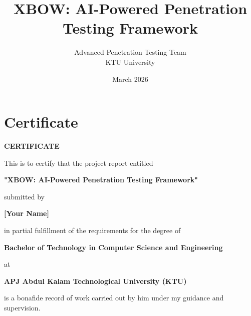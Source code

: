 \documentclass[12pt,a4paper]{report}
\title{XBOW: AI-Powered Penetration Testing Framework}
\author{Advanced Penetration Testing Team \\ KTU University}
\date{March 2026}
\begin{document}
\maketitle
\thispagestyle{empty}
\newpage

\chapter*{Certificate}
\thispagestyle{empty}

\begin{center}
    \vspace{2cm}
    
    \textbf{CERTIFICATE}
    
    \vspace{1cm}
    
    This is to certify that the project report entitled
    
    \vspace{0.5cm}
    
    \textbf{"XBOW: AI-Powered Penetration Testing Framework"}
    
    \vspace{0.5cm}
    
    submitted by
    
    \vspace{0.5cm}
    
    \textbf{[Your Name]}
    
    \vspace{0.5cm}
    
    in partial fulfillment of the requirements for the degree of
    
    \vspace{0.5cm}
    
    \textbf{Bachelor of Technology in Computer Science and Engineering}
    
    \vspace{0.5cm}
    
    at
    
    \vspace{0.5cm}
    
    \textbf{APJ Abdul Kalam Technological University (KTU)}
    
    \vspace{0.5cm}
    
    is a bonafide record of work carried out by him under my guidance and supervision.
    
    \vspace{2cm}
    

\end{center}
\end{document}
